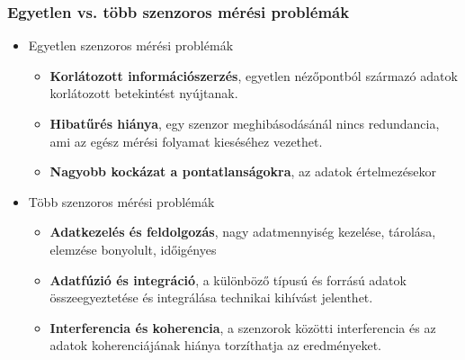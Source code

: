 \subsubsection{Egyetlen vs. több szenzoros mérési problémák}
\begin{itemize}
    \item Egyetlen szenzoros mérési problémák
    \begin{itemize}
        \item \textbf{Korlátozott információszerzés}, egyetlen nézőpontból származó adatok korlátozott betekintést nyújtanak.
        \item \textbf{Hibatűrés hiánya}, egy szenzor meghibásodásánál nincs redundancia, ami az egész mérési folyamat kieséséhez vezethet.
        \item \textbf{Nagyobb kockázat a pontatlanságokra}, az adatok értelmezésekor
    \end{itemize}
    \item Több szenzoros mérési problémák
    \begin{itemize}
        \item \textbf{Adatkezelés és feldolgozás}, nagy adatmennyiség kezelése, tárolása, elemzése bonyolult, időigényes
        \item \textbf{Adatfúzió és integráció}, a különböző típusú és forrású adatok összeegyeztetése és integrálása technikai kihívást jelenthet.
        \item \textbf{Interferencia és koherencia}, a szenzorok közötti interferencia és az adatok koherenciájának hiánya torzíthatja az eredményeket.
    \end{itemize}
\end{itemize}

\clearpage
